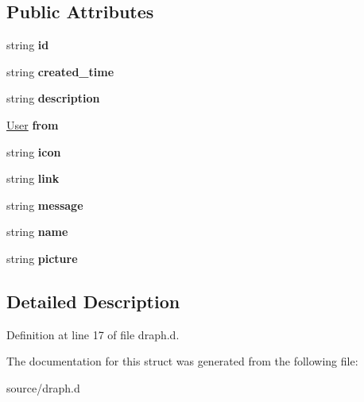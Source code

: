 \subsection*{Public Attributes}
\begin{DoxyCompactItemize}
\item 
\mbox{\label{structdraph_1_1Link_ac8460919f97c36b46eb5c62e99f96391}} 
string {\bfseries id}
\item 
\mbox{\label{structdraph_1_1Link_aacbe7ff208101a61c2970d0d37ab35e6}} 
string {\bfseries created\+\_\+time}
\item 
\mbox{\label{structdraph_1_1Link_a4dfa15dc3f8328893015d73d77aac871}} 
string {\bfseries description}
\item 
\mbox{\label{structdraph_1_1Link_a509a2f5acc4b37e71265bc6b38d9f966}} 
\hyperlink{structdraph_1_1User}{User} {\bfseries from}
\item 
\mbox{\label{structdraph_1_1Link_afc96fffd750dd241c2db4d3aebb9762e}} 
string {\bfseries icon}
\item 
\mbox{\label{structdraph_1_1Link_a23be30f2ce181a49c68798fe63ce828b}} 
string {\bfseries link}
\item 
\mbox{\label{structdraph_1_1Link_a988a5d092f47d398d376606a7f45c820}} 
string {\bfseries message}
\item 
\mbox{\label{structdraph_1_1Link_a021587914f920f829813366b61f734f4}} 
string {\bfseries name}
\item 
\mbox{\label{structdraph_1_1Link_ae34bea53135fcfd05c27ce17be444bd8}} 
string {\bfseries picture}
\end{DoxyCompactItemize}


\subsection{Detailed Description}


Definition at line 17 of file draph.\+d.



The documentation for this struct was generated from the following file\+:\begin{DoxyCompactItemize}
\item 
source/draph.\+d\end{DoxyCompactItemize}
